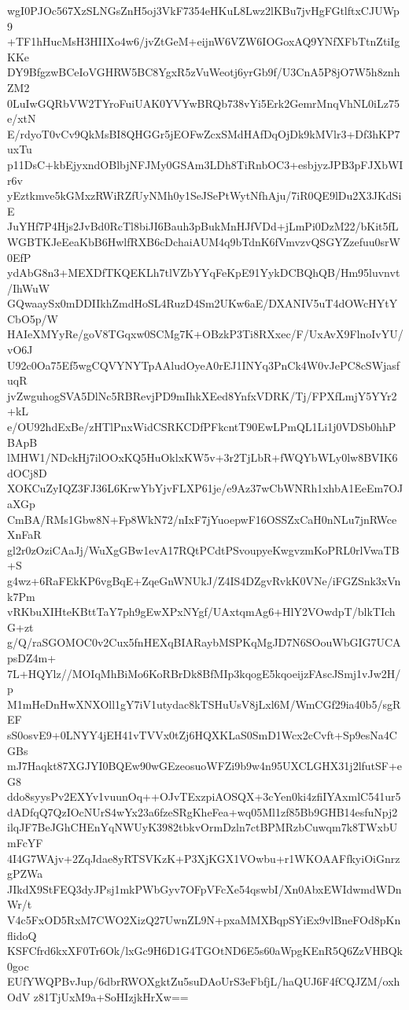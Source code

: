 wgI0PJOc567XzSLNGsZnH5oj3VkF7354eHKuL8Lwz2lKBu7jvHgFGtlftxCJUWp9
+TF1hHucMsH3HIIXo4w6/jvZtGeM+eijnW6VZW6IOGoxAQ9YNfXFbTtnZtiIgKKe
DY9BfgzwBCeIoVGHRW5BC8YgxR5zVuWeotj6yrGb9f/U3CnA5P8jO7W5h8znhZM2
0LuIwGQRbVW2TYroFuiUAK0YVYwBRQb738vYi5Erk2GemrMnqVhNL0iLz75e/xtN
E/rdyoT0vCv9QkMsBI8QHGGr5jEOFwZcxSMdHAfDqOjDk9kMVlr3+Df3hKP7uxTu
p11DsC+kbEjyxndOBlbjNFJMy0GSAm3LDh8TiRnbOC3+esbjyzJPB3pFJXbWIr6v
yEztkmve5kGMxzRWiRZfUyNMh0y1SeJSePtWytNfhAju/7iR0QE9lDu2X3JKdSiE
JuYHf7P4Hjs2JvBd0RcTl8biJI6Bauh3pBukMnHJfVDd+jLmPi0DzM22/bKit5fL
WGBTKJeEeaKbB6HwlfRXB6cDchaiAUM4q9bTdnK6fVmvzvQSGYZzefuu0srW0EfP
ydAbG8n3+MEXDfTKQEKLh7tlVZbYYqFeKpE91YykDCBQhQB/Hm95luvnvt/IhWuW
GQwaaySx0mDDIIkhZmdHoSL4RuzD4Sm2UKw6aE/DXANIV5uT4dOWcHYtYCbO5p/W
HAIeXMYyRe/goV8TGqxw0SCMg7K+OBzkP3Ti8RXxec/F/UxAvX9FlnoIvYU/vO6J
U92c0Oa75Ef5wgCQVYNYTpAAludOyeA0rEJ1INYq3PnCk4W0vJePC8cSWjasfuqR
jvZwguhogSVA5DlNc5RBRevjPD9mIhkXEed8YnfxVDRK/Tj/FPXfLmjY5YYr2+kL
e/OU92hdExBe/zHTlPnxWidCSRKCDfPFkcntT90EwLPmQL1Li1j0VDSb0hhPBApB
lMHW1/NDckHj7ilOOxKQ5HuOklxKW5v+3r2TjLbR+fWQYbWLy0lw8BVIK6dOCj8D
XOKCuZyIQZ3FJ36L6KrwYbYjvFLXP61je/e9Az37wCbWNRh1xhbA1EeEm7OJaXGp
CmBA/RMs1Gbw8N+Fp8WkN72/nIxF7jYuoepwF16OSSZxCaH0nNLu7jnRWceXnFaR
gl2r0zOziCAaJj/WuXgGBw1evA17RQtPCdtPSvoupyeKwgvzmKoPRL0rlVwaTB+S
g4wz+6RaFEkKP6vgBqE+ZqeGnWNUkJ/Z4IS4DZgvRvkK0VNe/iFGZSnk3xVnk7Pm
vRKbuXIHteKBttTaY7ph9gEwXPxNYgf/UAxtqmAg6+HlY2VOwdpT/blkTIchG+zt
g/Q/raSGOMOC0v2Cux5fnHEXqBIARaybMSPKqMgJD7N6SOouWbGIG7UCApsDZ4m+
7L+HQYlz//MOIqMhBiMo6KoRBrDk8BfMIp3kqogE5kqoeijzFAscJSmj1vJw2H/p
M1mHeDnHwXNXOll1gY7iV1utydac8kTSHuUsV8jLxl6M/WmCGf29ia40b5/sgREF
sS0osvE9+0LNYY4jEH41vTVVx0tZj6HQXKLaS0SmD1Wcx2cCvft+Sp9esNa4CGBs
mJ7Haqkt87XGJYI0BQEw90wGEzeosuoWFZi9b9w4n95UXCLGHX31j2lfutSF+eG8
ddo8syysPv2EXYv1vuunOq++OJvTExzpiAOSQX+3cYen0ki4zfiIYAxmlC541ur5
dADfqQ7QzIOcNUrS4wYx23a6fzeSRgKheFea+wq05Ml1zf85Bb9GHB14esfuNpj2
ilqJF7BeJGhCHEnYqNWUyK3982tbkvOrmDzln7ctBPMRzbCuwqm7k8TWxbUmFcYF
4I4G7WAjv+2ZqJdae8yRTSVKzK+P3XjKGX1VOwbu+r1WKOAAFfkyiOiGnrzgPZWa
JIkdX9StFEQ3dyJPsj1mkPWbGyv7OFpVFcXe54qswbI/Xn0AbxEWIdwmdWDnWr/t
V4c5FxOD5RxM7CWO2XizQ27UwnZL9N+pxaMMXBqpSYiEx9vlBneFOd8pKnflidoQ
KSFCfrd6kxXF0Tr6Ok/lxGc9H6D1G4TGOtND6E5s60aWpgKEnR5Q6ZzVHBQk0goc
EUfYWQPBvJup/6dbrRWOXgktZu5suDAoUrS3eFbfjL/haQUJ6F4fCQJZM/oxhOdV
z81TjUxM9a+SoHIzjkHrXw==
